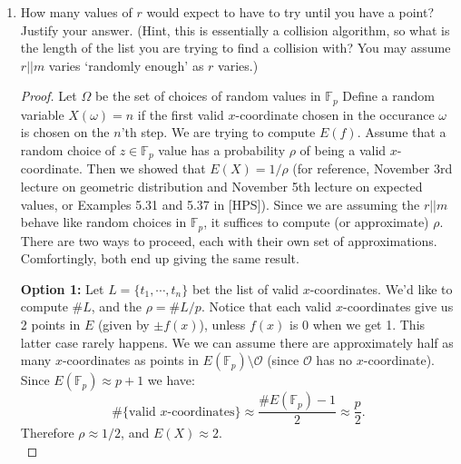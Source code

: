 \documentclass[11pt]{article}
\newcommand{\bF}{\mathbb{F}}
\newcommand{\cO}{\mathcal{O}}
\begin{document}
\begin{enumerate}
{\begin{enumerate}
{\begin{enumerate}[(1)]
{      }
    \end{enumerate}
    Describe exactly how Step 4 would be carried out.  (You may assume that you have a fast algorithm to compute square roots modulo $p$ if they exist).  Conversely explain how to reverse the algorithm to recover the plaintext from a point.
    }
    \begin{proof}
      Let $z = r||m\in\bF_p$, and consider $f(z) = z^3 + Az + B$.  We first compute $\left(\frac{f(z)}{p}\right) = f(z)^{\frac{p-1}{2}}\mod p$.  If this is 1, then we compute $y = \sqrt{f(z)}\mod p$, and our message will be the point $P=(z,y)$.  (Notice if $\left(frac{f(z)}{p}\right)=0$ then we could compute a square root, but it would be 0.  This would give us an order 2 point on the curve and not be very secure for communication.  In general, we could check that $P$ has relatively high order before continuing.)\\

      To reverse this process, given a point $P=(x,y)$ we can recover the message $m$ as the last $k$-bits of $x$.
    \end{proof}
    \item{
    How many values of $r$ would expect to have to try until you have a point?  Justify your answer.  (Hint, this is essentially a collision algorithm, so what is the length of the list you are trying to find a collision with?  You may assume $r||m$ varies `randomly enough' as $r$ varies.)
    }
    \begin{proof}
      Let $\Omega$ be the set of choices of random values in $\bF_p$ Define a random variable $X(\omega) = n$ if the first valid $x$-coordinate chosen in the occurance $\omega$ is chosen on the $n$'th step.  We are trying to compute $E(f)$.  Assume that a random choice of $z\in\bF_p$ value has a probability $\rho$ of being a valid $x$-coordinate.  Then we showed that $E(X) = 1/\rho$ (for reference, November 3rd lecture on geometric distribution and November 5th lecture on expected values, or Examples 5.31 and 5.37 in [HPS]).  Since we are assuming the $r||m$ behave like random choices in $\bF_p$, it suffices to compute (or approximate) $\rho$.  There are two ways to proceed, each with their own set of approximations.  Comfortingly, both end up giving the same result.

      \textbf{Option 1:} Let $L = \{t_1,\cdots,t_n\}$ bet the list of valid $x$-coordinates.  We'd like to compute $\#L$, and the $\rho = \#L/p$.  Notice that each valid $x$-coordinates give us 2 points in $E$ (given by $\pm f(x)$), unless $f(x)$ is 0 when we get 1.  This latter case rarely happens.  We we can assume there are approximately half as many $x$-coordinates as points in $E(\bF_p)\setminus\cO$ (since $\cO$ has no $x$-coordinate).  Since $E(\bF_p)\approx p+1$ we have:
      \[\#\{\text{valid }x\text{-coordinates}\} \approx\frac{\#E(\bF_p)-1}{2}\approx\frac{p}{2}.\]
      Therefore $\rho\approx 1/2$, and $E(X)\approx 2$.\\


\end{proof}
\end{enumerate}}
\end{enumerate}
\end{document}
